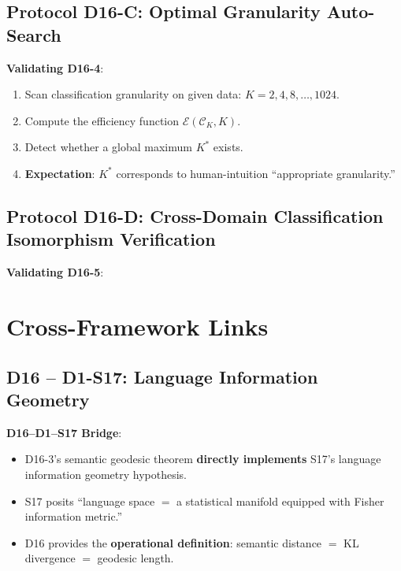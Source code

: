 \documentclass[12pt, a4paper]{article}
\newcommand{\calI}{\mathcal{I}}
\begin{document}
\subsection{Protocol D16-C: Optimal Granularity Auto-Search}

\textbf{Validating D16-4}:
\begin{enumerate}
    \item Scan classification granularity on given data: $K = 2, 4, 8, \ldots, 1024$.
    \item Compute the efficiency function $\mathcal{E}(\mathcal{C}_K, K)$.
    \item Detect whether a global maximum $K^*$ exists.
    \item \textbf{Expectation}: $K^*$ corresponds to human-intuition ``appropriate granularity.''
\end{enumerate}

\subsection{Protocol D16-D: Cross-Domain Classification Isomorphism Verification}

\textbf{Validating D16-5}:

\section{Cross-Framework Links}

\subsection{D16 -- D1-S17: Language Information Geometry}

\textbf{D16--D1--S17 Bridge}:
\begin{itemize}
    \item D16-3's semantic geodesic theorem \textbf{directly implements} S17's language information geometry hypothesis.
    \item S17 posits ``language space $=$ a statistical manifold equipped with Fisher information metric.''
    \item D16 provides the \textbf{operational definition}: semantic distance $=$ KL divergence $=$ geodesic length.
\end{itemize}
\end{document}
